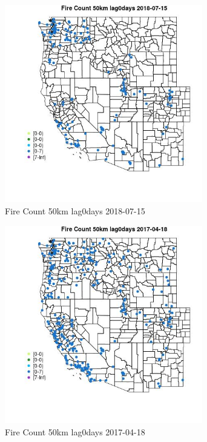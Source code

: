 \begin{figure} 
\centering  
\includegraphics[width=0.77\textwidth]{Code_Outputs/Report_ML_input_PM25_Step4_part_e_de_duplicated_aves_compiled_2019-05-20wNAs_MapObsFire_Count_50km_lag0days2018-07-15.jpg} 
\caption{\label{fig:Report_ML_input_PM25_Step4_part_e_de_duplicated_aves_compiled_2019-05-20wNAsMapObsFire_Count_50km_lag0days2018-07-15}Fire Count 50km lag0days 2018-07-15} 
\end{figure} 
 

\begin{figure} 
\centering  
\includegraphics[width=0.77\textwidth]{Code_Outputs/Report_ML_input_PM25_Step4_part_e_de_duplicated_aves_compiled_2019-05-20wNAs_MapObsFire_Count_50km_lag0days2017-04-18.jpg} 
\caption{\label{fig:Report_ML_input_PM25_Step4_part_e_de_duplicated_aves_compiled_2019-05-20wNAsMapObsFire_Count_50km_lag0days2017-04-18}Fire Count 50km lag0days 2017-04-18} 
\end{figure} 
 

